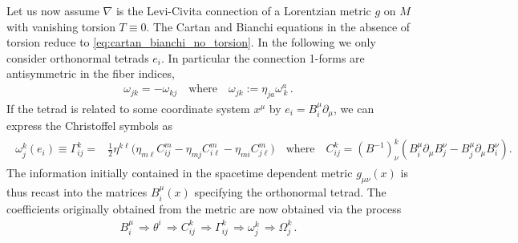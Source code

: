 \begin{mytheorem}
%
Let us now assume $\nabla$ is the Levi-Civita connection of a Lorentzian metric $g$ on $M$ with vanishing torsion $T\equiv 0$.
The Cartan and Bianchi equations in the absence of torsion reduce to \eqref{eq:cartan_bianchi_no_torsion}.
In the following we only consider orthonormal tetrads $e_i$.
In particular the connection 1-forms are antisymmetric in the fiber indices, 
\begin{align}
    \omega_{jk}=-\omega_{kj}\quad \text{where}\quad \omega_{jk}:=\eta_{j a} \omega^a_{\, k}\,.
\end{align}
If the tetrad is related to some coordinate system $x^\mu$ by $e_i = B_i^\mu \partial_\mu$, we can express the Christoffel symbols as
\begin{align}
\begin{aligned}
    \omega_j^k(e_i)\equiv \Gamma_{ij}^k=&\tfrac{1}{2} \eta^{k\ell} \Big( \eta_{m \ell} C^m_{ij} - \eta_{m j} C^m_{i \ell} - \eta_{m i} C^m_{j \ell} \Big)\quad \text{where}\quad C_{ij}^k= (B^{-1})^k_\nu \left( B_i^\mu \partial_\mu B_j^\nu - B_j^\mu \partial_\mu B_i^\nu \right).
\end{aligned}
\end{align} 
The information initially contained in the spacetime dependent metric $g_{\mu\nu}(x)$ is thus recast into the matrices $B_i^\mu(x)$ specifying the orthonormal tetrad.
The coefficients originally obtained from the metric are now obtained via the process 
\begin{align}
    B_i^\mu\, \Longrightarrow \theta^i\,\Longrightarrow C_{ij}^k\, \Longrightarrow \Gamma_{ij}^k\, \Longrightarrow \omega_j^k\, \Longrightarrow \Omega_j^k\,.
\end{align}
\end{mytheorem}


